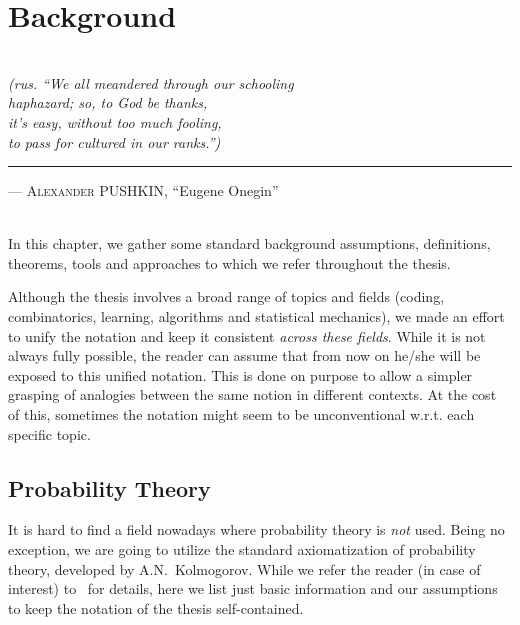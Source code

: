 \chapter{Background}
\label{sec:background}

\hfill
\begin{minipage}[t]{.75\textwidth}
 \\[.2cm]
  \textit{(rus. 
    ``We all meandered through our schooling \\ 
     haphazard; so, to God be thanks, \\
     it's easy, without too much fooling, \\
     to pass for cultured in our ranks.'')}\\
  \hrule
  \vspace{.2cm}
  \hfill
  \textsc{--- Alexander PUSHKIN}, ``Eugene Onegin''
\end{minipage}
\\[.5cm]

In this chapter, we gather some standard background assumptions, definitions,
theorems, tools and approaches to which we refer throughout the thesis. 

Although the thesis involves a broad range of topics and fields (coding,
combinatorics, learning, algorithms and statistical mechanics), we made an
effort to unify the notation and keep it consistent \textit{across these
fields}. While it is not always fully possible, the reader can assume that from
now on he/she will be exposed to this unified notation. This is done on purpose
to allow a simpler grasping of analogies between the same notion in different
contexts. At the cost of this, sometimes the notation might seem to be
unconventional w.r.t. each specific topic.
 
\section{Probability Theory}
It is hard to find a field nowadays where probability theory is \textit{not}
used. Being no exception, we are going to utilize the standard axiomatization of
probability theory, developed by A.N.~Kolmogorov. While we refer the reader (in
case of interest) to~\citet{shiryaev95} for details, here we list just basic
information and our assumptions to keep the notation of the thesis
self-contained.

